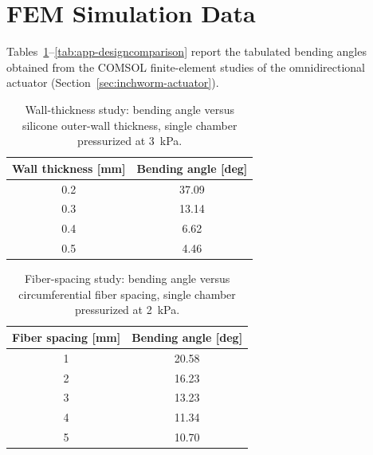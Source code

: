 

\appendix

\section{FEM Simulation Data}
\label{app:fem-data}

Tables~\ref{tab:app-wallthickness}--\ref{tab:app-designcomparison} report the
tabulated bending angles obtained from the COMSOL finite-element studies of
the omnidirectional actuator (Section~\ref{sec:inchworm-actuator}).

\begin{table}[tbh]
  \caption{Wall-thickness study: bending angle versus silicone outer-wall
  thickness, single chamber pressurized at 3~kPa.}
  \label{tab:app-wallthickness}
  \centering
  \footnotesize
  \begin{tabular}{|c|c|}
    \hline
    Wall thickness [mm] & Bending angle [deg] \\ \hline
    0.2 & 37.09 \\ \hline
    0.3 & 13.14 \\ \hline
    0.4 & 6.62 \\ \hline
    0.5 & 4.46 \\ \hline
  \end{tabular}
\end{table}

\begin{table}[tbh]
  \caption{Fiber-spacing study: bending angle versus circumferential fiber
  spacing, single chamber pressurized at 2~kPa.}
  \label{tab:app-fiberspacing}
  \centering
  \footnotesize
  \begin{tabular}{|c|c|}
    \hline
    Fiber spacing [mm] & Bending angle [deg] \\ \hline
    1 & 20.58 \\ \hline
    2 & 16.23 \\ \hline
    3 & 13.23 \\ \hline
    4 & 11.34 \\ \hline
    5 & 10.70 \\ \hline
  \end{tabular}
\end{table}

